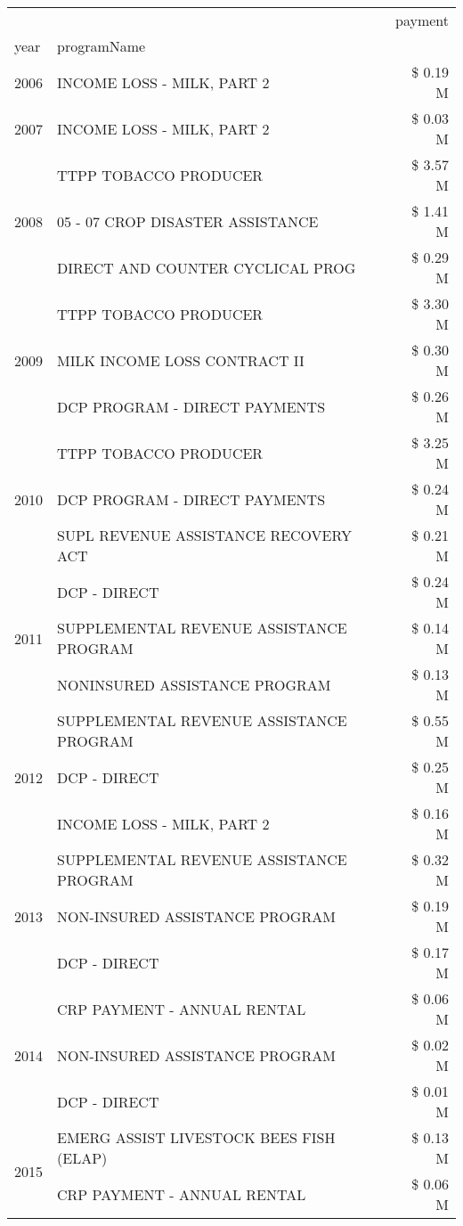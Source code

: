 \begin{tabular}{llr}
\toprule
 &  & payment \\
year & programName &  \\
\midrule
2006 & INCOME LOSS - MILK, PART 2 & \$ 0.19 M \\
\cline{1-3}
2007 & INCOME LOSS - MILK, PART 2 & \$ 0.03 M \\
\cline{1-3}
\multirow[t]{3}{*}{2008} & TTPP TOBACCO PRODUCER & \$ 3.57 M \\
 & 05 - 07 CROP DISASTER ASSISTANCE & \$ 1.41 M \\
 & DIRECT AND COUNTER CYCLICAL PROG & \$ 0.29 M \\
\cline{1-3}
\multirow[t]{3}{*}{2009} & TTPP TOBACCO PRODUCER & \$ 3.30 M \\
 & MILK INCOME LOSS CONTRACT II & \$ 0.30 M \\
 & DCP PROGRAM - DIRECT PAYMENTS & \$ 0.26 M \\
\cline{1-3}
\multirow[t]{3}{*}{2010} & TTPP TOBACCO PRODUCER & \$ 3.25 M \\
 & DCP PROGRAM - DIRECT PAYMENTS & \$ 0.24 M \\
 & SUPL REVENUE ASSISTANCE RECOVERY ACT & \$ 0.21 M \\
\cline{1-3}
\multirow[t]{3}{*}{2011} & DCP - DIRECT & \$ 0.24 M \\
 & SUPPLEMENTAL REVENUE ASSISTANCE PROGRAM & \$ 0.14 M \\
 & NONINSURED ASSISTANCE PROGRAM & \$ 0.13 M \\
\cline{1-3}
\multirow[t]{3}{*}{2012} & SUPPLEMENTAL REVENUE ASSISTANCE PROGRAM & \$ 0.55 M \\
 & DCP - DIRECT & \$ 0.25 M \\
 & INCOME LOSS - MILK, PART 2 & \$ 0.16 M \\
\cline{1-3}
\multirow[t]{3}{*}{2013} & SUPPLEMENTAL REVENUE ASSISTANCE PROGRAM & \$ 0.32 M \\
 & NON-INSURED ASSISTANCE PROGRAM & \$ 0.19 M \\
 & DCP - DIRECT & \$ 0.17 M \\
\cline{1-3}
\multirow[t]{3}{*}{2014} & CRP PAYMENT - ANNUAL RENTAL & \$ 0.06 M \\
 & NON-INSURED ASSISTANCE PROGRAM & \$ 0.02 M \\
 & DCP - DIRECT & \$ 0.01 M \\
\cline{1-3}
\multirow[t]{3}{*}{2015} & EMERG ASSIST LIVESTOCK BEES FISH (ELAP) & \$ 0.13 M \\
 & CRP PAYMENT - ANNUAL RENTAL & \$ 0.06 M \\

\end{tabular}
